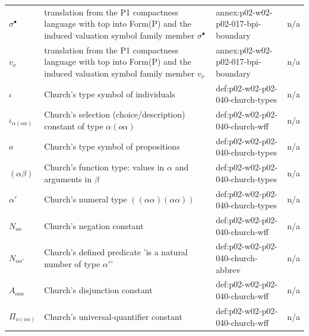 \begin{longtable}{@{}p{}p{}p{}p{}@{}}
\(\sigma^{\bullet}\) & translation from the P1 compactness language with top into Form(P) and the induced valuation symbol family member \(\sigma^{\bullet}\) & annex:\allowbreak{}p02-\allowbreak{}w02-\allowbreak{}p02-\allowbreak{}017-\allowbreak{}bpi-\allowbreak{}boundary & n/a \\
\(v_\nu\) & translation from the P1 compactness language with top into Form(P) and the induced valuation symbol family member \(v_\nu\) & annex:\allowbreak{}p02-\allowbreak{}w02-\allowbreak{}p02-\allowbreak{}017-\allowbreak{}bpi-\allowbreak{}boundary & n/a \\
\(\iota\) & Church's type symbol of individuals & def:\allowbreak{}p02-\allowbreak{}w02-\allowbreak{}p02-\allowbreak{}040-\allowbreak{}church-\allowbreak{}types & n/a \\
\(\iota_{\alpha(o\alpha)}\) & Church's selection (choice/description) constant of type \(\alpha(o\alpha)\) & def:\allowbreak{}p02-\allowbreak{}w02-\allowbreak{}p02-\allowbreak{}040-\allowbreak{}church-\allowbreak{}wff & n/a \\
\(o\) & Church's type symbol of propositions & def:\allowbreak{}p02-\allowbreak{}w02-\allowbreak{}p02-\allowbreak{}040-\allowbreak{}church-\allowbreak{}types & n/a \\
\((\alpha\beta)\) & Church's function type: values in \(\alpha\) and arguments in \(\beta\) & def:\allowbreak{}p02-\allowbreak{}w02-\allowbreak{}p02-\allowbreak{}040-\allowbreak{}church-\allowbreak{}types & n/a \\
\(\alpha'\) & Church's numeral type \(((\alpha\alpha)(\alpha\alpha))\) & def:\allowbreak{}p02-\allowbreak{}w02-\allowbreak{}p02-\allowbreak{}040-\allowbreak{}church-\allowbreak{}types & n/a \\
\(N_{oo}\) & Church's negation constant & def:\allowbreak{}p02-\allowbreak{}w02-\allowbreak{}p02-\allowbreak{}040-\allowbreak{}church-\allowbreak{}wff & n/a \\
\(N_{o\alpha'}\) & Church's defined predicate 'is a natural number of type \(\alpha'\)' & def:\allowbreak{}p02-\allowbreak{}w02-\allowbreak{}p02-\allowbreak{}040-\allowbreak{}church-\allowbreak{}abbrev & n/a \\
\(A_{ooo}\) & Church's disjunction constant & def:\allowbreak{}p02-\allowbreak{}w02-\allowbreak{}p02-\allowbreak{}040-\allowbreak{}church-\allowbreak{}wff & n/a \\
\(\Pi_{o(o\alpha)}\) & Church's universal-quantifier constant & def:\allowbreak{}p02-\allowbreak{}w02-\allowbreak{}p02-\allowbreak{}040-\allowbreak{}church-\allowbreak{}wff & n/a \\

\end{longtable}

